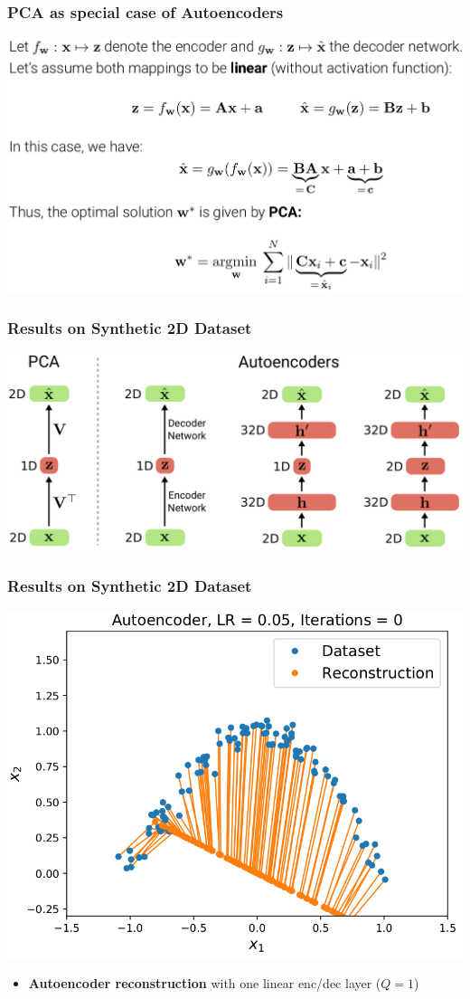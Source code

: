 \documentclass[10pt,aspectratio=169]{beamer}
\begin{document}
\begin{frame}
  \frametitle{PCA as special case of Autoencoders}
\begin{center}
\includegraphics[width=.8\textwidth]{images/s16}
\end{center}
\end{frame}

\begin{frame}
  \frametitle{Results on Synthetic 2D Dataset}
\begin{center}
\includegraphics[width=.8\textwidth]{images/s17}
\end{center}
\end{frame}


\begin{frame}
  \frametitle{Results on Synthetic 2D Dataset}
\begin{center}
\includegraphics[width=.5\textwidth]{images/s18}
\end{center}
\small{
\begin{itemize}
\item \textbf{Autoencoder reconstruction} with one linear enc/dec layer ($Q=1$)
\end{itemize}
}
\end{frame}
\end{document}
